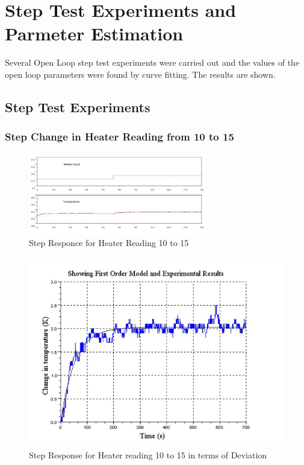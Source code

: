 \section{Step Test Experiments and Parmeter Estimation}
Several Open Loop step test experiments were carried out and the values of the open loop parameters were found by curve fitting. The results are shown.
\subsection{Step Test Experiments}
\subsubsection{Step Change in Heater Reading from 10 to 15}

	
\begin{figure}
\centering	\includegraphics[width=0.7\textwidth]{Vikas_self/report_tex/parameter_estimation/10to15.jpg}
	\caption{Step Responce for Heater Reading 10 to 15}
	\label{fig:10to15}
\end{figure}

	
	
\begin{figure}[h]
\centering
	\includegraphics[width = .75\textwidth]{Vikas_self/report_tex/parameter_estimation/optimized10to15.jpg}
		\caption{Step Response for Heater reading 10 to 15 in terms of Deviation}
	\label{optimized10to15}
\end{figure}

